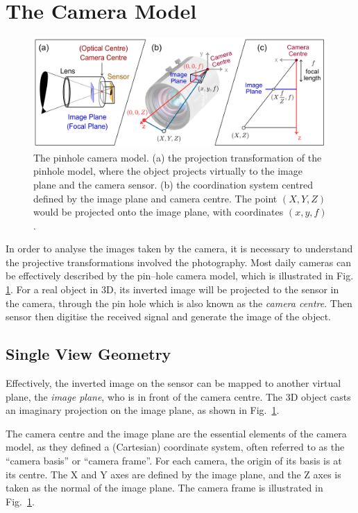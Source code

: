 \documentclass[11pt,twoside]{report}
\begin{document}
\section{The Camera Model}
\label{section:camera}

\begin{figure}
  \includegraphics[width=\linewidth,outer]{camera-model}
  \caption[The pinhole camera model]{The pinhole camera model. (a) the projection transformation of the pinhole model, where the object projects virtually to the image plane and the camera sensor. (b) the coordination system centred defined by the image plane and camera centre. The point $(X, Y, Z)$ would be projected onto the image plane, with coordinates $(x, y, f)$.}
  \label{fig:camera_model}
\end{figure}

In order to analyse the images taken by the camera, it is necessary to understand the projective transformations involved the photography. Most daily cameras can be effectively described by the pin--hole camera model, which is illustrated in Fig. \ref{fig:camera_model}. For a real object in 3D, its inverted image will be projected to the sensor in the camera, through the pin hole which is also known as the \emph{camera centre}. Then sensor then digitise the received signal and generate the image of the object.

\subsection{Single View Geometry}

Effectively, the inverted image on the sensor can be mapped to another virtual plane, the \emph{image plane}, who is in front of the camera centre. The 3D object casts an imaginary projection on the image plane, as shown in Fig.\ \ref{fig:camera_model}.

The camera centre and the image plane are the essential elements of the camera model, as they defined a (Cartesian) coordinate system, often referred to as the ``camera basis'' or ``camera frame''. For each camera, the origin of its basis is at its centre. The X and Y axes are defined by the image plane, and the Z axes is taken as the normal of the image plane. The camera frame is illustrated in Fig.\ \ref{fig:camera_model}.
\end{document}
